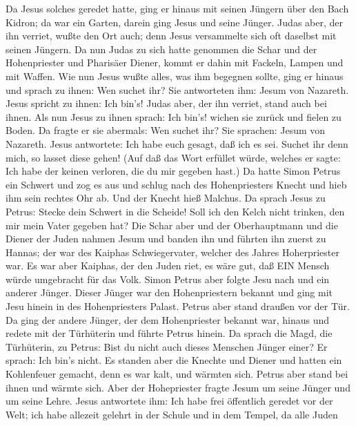  Da Jesus solches geredet hatte, ging er hinaus mit seinen
Jüngern über den Bach Kidron; da war ein Garten, darein ging Jesus und
seine Jünger.  Judas aber, der ihn verriet, wußte den Ort
auch; denn Jesus versammelte sich oft daselbst mit seinen Jüngern.
 Da nun Judas zu sich hatte genommen die Schar und der
Hohenpriester und Pharisäer Diener, kommt er dahin mit Fackeln, Lampen
und mit Waffen.  Wie nun Jesus wußte alles, was ihm begegnen
sollte, ging er hinaus und sprach zu ihnen: Wen suchet ihr? 
Sie antworteten ihm: Jesum von Nazareth. Jesus spricht zu ihnen: Ich
bin's! Judas aber, der ihn verriet, stand auch bei ihnen. 
Als nun Jesus zu ihnen sprach: Ich bin's! wichen sie zurück und fielen
zu Boden.  Da fragte er sie abermals: Wen suchet ihr? Sie
sprachen: Jesum von Nazareth.  Jesus antwortete: Ich habe
euch gesagt, daß ich es sei. Suchet ihr denn mich, so lasset diese
gehen!  (Auf daß das Wort erfüllet würde, welches er sagte:
Ich habe der keinen verloren, die du mir gegeben hast.)  Da
hatte Simon Petrus ein Schwert und zog es aus und schlug nach des
Hohenpriesters Knecht und hieb ihm sein rechtes Ohr ab. Und der Knecht
hieß Malchus.  Da sprach Jesus zu Petrus: Stecke dein
Schwert in die Scheide! Soll ich den Kelch nicht trinken, den mir mein
Vater gegeben hat?  Die Schar aber und der Oberhauptmann
und die Diener der Juden nahmen Jesum und banden ihn  und
führten ihn zuerst zu Hannas; der war des Kaiphas Schwiegervater,
welcher des Jahres Hoherpriester war.  Es war aber Kaiphas,
der den Juden riet, es wäre gut, daß EIN Mensch würde umgebracht für das
Volk.  Simon Petrus aber folgte Jesu nach und ein anderer
Jünger. Dieser Jünger war den Hohenpriestern bekannt und ging mit Jesu
hinein in des Hohenpriesters Palast.  Petrus aber stand
draußen vor der Tür. Da ging der andere Jünger, der dem Hohenpriester
bekannt war, hinaus und redete mit der Türhüterin und führte Petrus
hinein.  Da sprach die Magd, die Türhüterin, zu Petrus:
Bist du nicht auch dieses Menschen Jünger einer? Er sprach: Ich bin's
nicht.  Es standen aber die Knechte und Diener und hatten
ein Kohlenfeuer gemacht, denn es war kalt, und wärmten sich. Petrus aber
stand bei ihnen und wärmte sich.  Aber der Hohepriester
fragte Jesum um seine Jünger und um seine Lehre.  Jesus
antwortete ihm: Ich habe frei öffentlich geredet vor der Welt; ich habe
allezeit gelehrt in der Schule und in dem Tempel, da alle Juden
